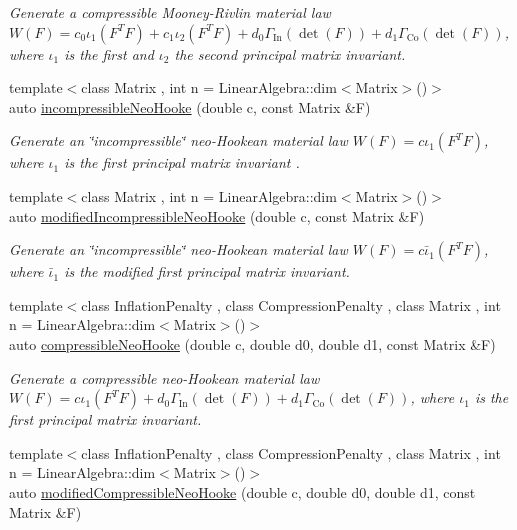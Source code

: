 \begin{DoxyCompactItemize}
\begin{DoxyCompactList}\small\item\em Generate a compressible Mooney-\/\+Rivlin material law $ W(F)=c_0\iota_1(F^T F) + c_1\iota_2(F^T F) + d_0\Gamma_\mathrm{In}(\det(F))+d_1\Gamma_\mathrm{Co}(\det(F)) $, where $\iota_1$ is the first and $\iota_2$ the second principal matrix invariant. \end{DoxyCompactList}\item 
{\footnotesize template$<$class Matrix , int n = Linear\+Algebra\+::dim$<$\+Matrix$>$()$>$ }\\auto \hyperlink{group__Rubber_ga5bb28aef7006413775791998936d6b81}{incompressible\+Neo\+Hooke} (double c, const Matrix \&F)
\begin{DoxyCompactList}\small\item\em Generate an \char`\"{}incompressible\char`\"{} neo-\/\+Hookean material law $ W(F)=c\iota_1(F^T F) $, where $\iota_1$ is the first principal matrix invariant . \end{DoxyCompactList}\item 
{\footnotesize template$<$class Matrix , int n = Linear\+Algebra\+::dim$<$\+Matrix$>$()$>$ }\\auto \hyperlink{group__Rubber_gaf6f5ab6a379ef03d513acc5042731a01}{modified\+Incompressible\+Neo\+Hooke} (double c, const Matrix \&F)
\begin{DoxyCompactList}\small\item\em Generate an \char`\"{}incompressible\char`\"{} neo-\/\+Hookean material law $ W(F)=c\bar\iota_1(F^T F) $, where $\bar\iota_1$ is the modified first principal matrix invariant. \end{DoxyCompactList}\item 
{\footnotesize template$<$class Inflation\+Penalty , class Compression\+Penalty , class Matrix , int n = Linear\+Algebra\+::dim$<$\+Matrix$>$()$>$ }\\auto \hyperlink{group__Rubber_gac5c39cd9de55f4f0220a806cf28a7b30}{compressible\+Neo\+Hooke} (double c, double d0, double d1, const Matrix \&F)
\begin{DoxyCompactList}\small\item\em Generate a compressible neo-\/\+Hookean material law $ W(F)=c\iota_1(F^T F)+d_0\Gamma_\mathrm{In}(\det(F))+d_1\Gamma_\mathrm{Co}(\det(F)) $, where $\iota_1$ is the first principal matrix invariant. \end{DoxyCompactList}\item 
{\footnotesize template$<$class Inflation\+Penalty , class Compression\+Penalty , class Matrix , int n = Linear\+Algebra\+::dim$<$\+Matrix$>$()$>$ }\\auto \hyperlink{group__Rubber_gac10942df03f037afdf0a81d330361a6b}{modified\+Compressible\+Neo\+Hooke} (double c, double d0, double d1, const Matrix \&F)

\end{DoxyCompactItemize}

